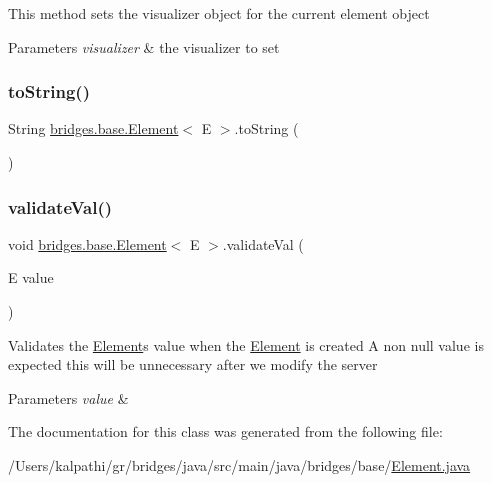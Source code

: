 This method sets the visualizer object for the current element object


\begin{DoxyParams}{Parameters}
{\em visualizer} & the visualizer to set \\
\hline
\end{DoxyParams}
\mbox{\label{classbridges_1_1base_1_1_element_a7dc685e317fd9dc2e73e049a9f907e42}} 
\subsubsection{\texorpdfstring{toString()}{toString()}}
{\footnotesize\ttfamily String \mbox{\hyperlink{classbridges_1_1base_1_1_element}{bridges.\+base.\+Element}}$<$ E $>$.to\+String (\begin{DoxyParamCaption}{ }\end{DoxyParamCaption})}

\mbox{\label{classbridges_1_1base_1_1_element_af1a60f4e6a91d379179f7d56e6dc3829}} 
\subsubsection{\texorpdfstring{validateVal()}{validateVal()}}
{\footnotesize\ttfamily void \mbox{\hyperlink{classbridges_1_1base_1_1_element}{bridges.\+base.\+Element}}$<$ E $>$.validate\+Val (\begin{DoxyParamCaption}\item[{E}]{value }\end{DoxyParamCaption})\hspace{0.3cm}{\ttfamily [protected]}}

Validates the \mbox{\hyperlink{classbridges_1_1base_1_1_element}{Element}}\textquotesingle{}s value when the \mbox{\hyperlink{classbridges_1_1base_1_1_element}{Element}} is created A non null value is expected this will be unnecessary after we modify the server 
\begin{DoxyParams}{Parameters}
{\em value} & \\
\hline
\end{DoxyParams}


The documentation for this class was generated from the following file\+:\begin{DoxyCompactItemize}
\item 
/\+Users/kalpathi/gr/bridges/java/src/main/java/bridges/base/\mbox{\hyperlink{_element_8java}{Element.\+java}}\end{DoxyCompactItemize}
